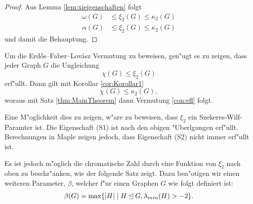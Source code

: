\begin{proof}
  Aus Lemma \ref{lem:xieigenschaften} folgt
  \begin{align*}
    \omega(G) &\leq \xi_{2}(G) \leq \kappa_{2}(G) \\
    \alpha(G) &\leq \xi_{2}(G) \leq \kappa_{2}(G) 
  \end{align*}
  und damit die Behauptung.
\end{proof}

Um die Erd\H{o}s--Faber--Lov\'asz Vermutung zu beweisen, gen"ugt es zu zeigen, dass jeder Graph $G$ die Ungleichung $$\chi(G) \leq \xi_{2}(G)$$ erf"ullt. Dann gilt mit Korollar \ref{cor:Korollar1} $$\chi(G) \leq \kappa_{2}(G),$$  woraus mit Satz \ref{thm:MainTheorem} dann Vermutung \ref{con:efl} folgt.

Eine M"oglichkeit dies zu zeigen, w"are zu beweisen, dass $\xi_2$ ein Szekeres-Wilf-Paramter ist. Die Eigenschaft (S1) ist nach den obigen "Uberlgungen erf"ullt. Berechnungen in Maple zeigen jedoch, dass Eigenschaft (S2) nicht immer erf"ullt ist. 

Es ist jedoch m"oglich die chromatische Zahl durch eine Funktion von $\xi_2$ nach oben zu beschr"anken, wie der folgende Satz zeigt. Dazu ben"otigen wir einen weiteren Parameter, $\beta$, welcher f"ur einen Graphen $G$ wie folgt definiert ist:
$$\beta(G) = \max\{|H| \;|\; H\unlhd G, \lambda_{min}(H) > -2 \}.$$

